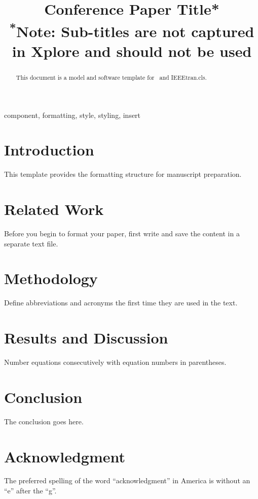\documentclass[conference]{IEEEtran}
\begin{document}
\title{Conference Paper Title*\\
{\footnotesize \textsuperscript{*}Note: Sub-titles are not captured in Xplore and
should not be used}
}

\author{
}

\maketitle

\begin{abstract}
This document is a model and software template for \LaTeXe\ and IEEEtran.cls.
\end{abstract}

\begin{IEEEkeywords}
component, formatting, style, styling, insert
\end{IEEEkeywords}

\section{Introduction}
This template provides the formatting structure for manuscript preparation.

\section{Related Work}
Before you begin to format your paper, first write and save the content in a separate text file.

\section{Methodology}
Define abbreviations and acronyms the first time they are used in the text.

\section{Results and Discussion}
Number equations consecutively with equation numbers in parentheses.

\section{Conclusion}
The conclusion goes here.

\section*{Acknowledgment}
The preferred spelling of the word ``acknowledgment'' in America is without an ``e'' after the ``g''.



\end{document}
